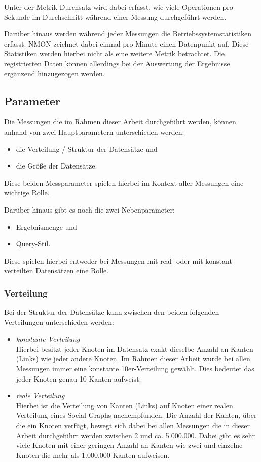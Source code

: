 Unter der Metrik Durchsatz wird dabei erfasst, wie viele Operationen pro Sekunde im Durchschnitt während einer Messung durchgeführt werden. 

Darüber hinaus werden während jeder Messungen die Betriebssystemstatistiken erfasst. NMON zeichnet dabei einmal pro Minute einen Datenpunkt auf. Diese Statistiken werden hierbei nicht als eine weitere Metrik betrachtet. Die registrierten Daten können allerdings bei der Auswertung der Ergebnisse ergänzend hinzugezogen werden.

\subsection{Parameter}
\label{analyse:parameter}
Die Messungen die im Rahmen dieser Arbeit durchgeführt werden, können anhand von zwei Hauptparametern unterschieden werden:
\begin{itemize}
    \item die Verteilung / Struktur der Datensätze und 
    \item die Größe der Datensätze. 
\end{itemize}
Diese beiden Messparameter spielen hierbei im Kontext aller Messungen eine wichtige Rolle. 

Darüber hinaus gibt es noch die zwei Nebenparameter:
\begin{itemize}
    \item Ergebnismenge und 
    \item Query-Stil. 
\end{itemize}
Diese spielen hierbei entweder bei Messungen mit real- oder mit konstant-verteilten Datensätzen eine Rolle.  

\subsubsection{Verteilung}
Bei der Struktur der Datensätze kann zwischen den beiden folgenden Verteilungen unterschieden werden: 

\begin{itemize}
    \item \textit{konstante Verteilung}\\
    Hierbei besitzt jeder Knoten im Datensatz exakt dieselbe Anzahl an Kanten (Links) wie jeder andere Knoten. Im Rahmen dieser Arbeit wurde bei allen Messungen immer eine konstante 10er-Verteilung gewählt. Dies bedeutet das jeder Knoten genau 10 Kanten aufweist.  
    \item \textit{reale Verteilung}\\
    Hierbei ist die Verteilung von Kanten (Links) auf Knoten einer realen Verteilung eines Social-Graphs nachempfunden. Die Anzahl der Kanten, über die ein Knoten verfügt, bewegt sich dabei bei allen Messungen die in dieser Arbeit durchgeführt werden zwischen 2 und ca. 5.000.000. Dabei gibt es sehr viele Knoten mit einer geringen Anzahl an Kanten wie zwei und einzelne Knoten die mehr als 1.000.000 Kanten aufweisen. 
\end{itemize}

